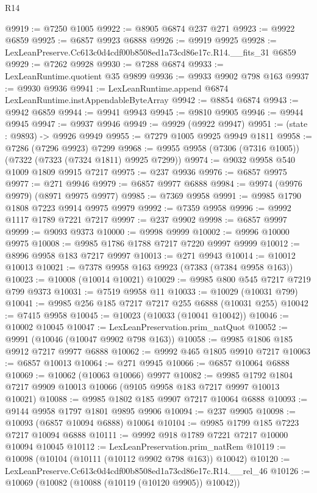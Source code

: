 \begin{lexlean}{R14}
\begin{coremodule}
@9919 := @7250 @1005
@9922 := @8905 @6874 @237 @271
@9923 := @9922 @6859
@9925 := @6857 @9923 @6888
@9926 := @9919 @9925
@9928 := LexLeanPreserve.Cc613c0d4cdf00b8508ed1a73cd86e17c.R14.__fits_31 @6859
@9929 := @7262 @9928
@9930 := @7288 @6874
@9933 := LexLeanRuntime.quotient @35 @9899
@9936 := @9933 @9902 @798 @163
@9937 := @9930 @9936
@9941 := LexLeanRuntime.append @6874 LexLeanRuntime.instAppendableByteArray
@9942 := @8854 @6874
@9943 := @9942 @6859
@9944 := @9941 @9943
@9945 := @9810 @9905
@9946 := @9944 @9945
@9947 := @9937 @9946
@9949 := @9929 (@9922 @9947)
@9951 := (state : @9893) -> @9926 @9949
@9955 := @7279 @1005 @9925 @9949 @1811
@9958 := @7286 (@7296 @9923) @7299
@9968 := @9955 @9958 (@7306 (@7316 @1005)) (@7322 (@7323 (@7324 @1811) @9925 @7299))
@9974 := @9032 @9958 @540 @1009 @1809 @9915 @7217
@9975 := @237 @9936
@9976 := @6857 @9975
@9977 := @271 @9946
@9979 := @6857 @9977 @6888
@9984 := @9974 (@9976 @9979) (@8971 @9975 @9977)
@9985 := @7369 @9958
@9991 := @9985 @1790 @1808 @7223 @9914 @9975 @9979
@9992 := @7359 @9958
@9996 := @9992 @1117 @1789 @7221 @7217
@9997 := @237 @9902
@9998 := @6857 @9997
@9999 := @9093 @9373
@10000 := @9998 @9999
@10002 := @9996 @10000 @9975
@10008 := @9985 @1786 @1788 @7217 @7220 @9997 @9999
@10012 := @8996 @9958 @183 @7217 @9997
@10013 := @271 @9943
@10014 := @10012 @10013
@10021 := @7378 @9958 @163 @9923 (@7383 (@7384 @9958 @163))
@10023 := @10008 (@10014 @10021)
@10029 := @9985 @800 @545 @7217 @7219 @799 @9373
@10031 := @7519 @9958 @11
@10033 := @10029 (@10031 @799)
@10041 := @9985 @256 @185 @7217 @7217 @255 @6888 (@10031 @255)
@10042 := @7415 @9958
@10045 := @10023 (@10033 (@10041 @10042))
@10046 := @10002 @10045
@10047 := LexLeanPreservation.prim_natQuot
@10052 := @9991 (@10046 (@10047 @9902 @798 @163))
@10058 := @9985 @1806 @185 @9912 @7217 @9977 @6888
@10062 := @9992 @465 @1805 @9910 @7217
@10063 := @6857 @10013
@10064 := @271 @9945
@10066 := @6857 @10064 @6888
@10069 := @10062 (@10063 @10066) @9977
@10082 := @9985 @1792 @1804 @7217 @9909 @10013 @10066 (@9105 @9958 @183 @7217 @9997 @10013 @10021)
@10088 := @9985 @1802 @185 @9907 @7217 @10064 @6888
@10093 := @9144 @9958 @1797 @1801 @9895 @9906
@10094 := @237 @9905
@10098 := @10093 (@6857 @10094 @6888) @10064
@10104 := @9985 @1799 @185 @7223 @7217 @10094 @6888
@10111 := @9992 @918 @1789 @7221 @7217 @10000 @10094 @10045
@10112 := LexLeanPreservation.prim_natRem
@10119 := @10098 (@10104 (@10111 (@10112 @9902 @798 @163)) @10042)
@10120 := LexLeanPreserve.Cc613c0d4cdf00b8508ed1a73cd86e17c.R14.__rel_46
@10126 := @10069 (@10082 (@10088 (@10119 (@10120 @9905)) @10042))

\end{coremodule}
\end{lexlean}
